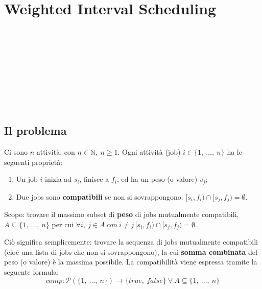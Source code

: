 \newpage
\section{Weighted Interval Scheduling}

\begin{center}
\begin{ganttchart}{0}{12}
     \\
     \\
     \\
     \\
     \\
     \\
     \\
     \\
\end{ganttchart}
\end{center}

\subsection{Il problema}
Ci sono $n$ attività, con $n \in \mathbb{N},\ n \geq 1$. Ogni attività (job) $i \in \{1,\ \dots,\ n\}$ ha le seguenti proprietà:
    \begin{enumerate}
        \item Un job $i$ inizia ad $s_i$, finisce a $f_i$, ed ha un peso (o valore) $v_j$;
        \item Due jobs sono \textbf{compatibili} se non si sovrappongono: $[s_i, f_i) \cap [s_j, f_j) = \emptyset$.
    \end{enumerate}

Scopo: trovare il massimo subset di \textbf{peso} di jobs mutualmente compatibili, $A \subseteq \{1,\ \dots,\ n\}$ per cui $\forall i,\ j \in A\ con\ i \neq j\, [s_i, f_i) \cap [s_j, f_j) = \emptyset$.

Ciò significa semplicemente: trovare la sequenza di jobs mutualmente compatibili (cioè una lista di jobs che non si sovrappongono), la cui \textbf{somma combinata} del peso (o valore) è la massima possibile. 
La compatibilità viene espressa tramite la seguente formula: 
$$comp : \mathcal{P}(\{1, \ \dots, \ n\}) \rightarrow \{true,\ false\}\ \forall \ A \subseteq \{1, \ \dots, \ n\}$$

